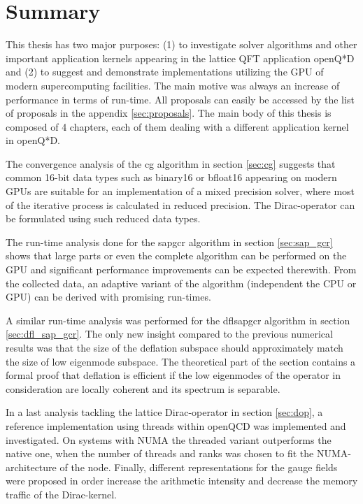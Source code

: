 \documentclass{article}
\theoremstyle{plain} %
\theoremstyle{convention} %
\theoremstyle{remark} %
\numberwithin{equation}{section}
\begin{document}
\section{Summary}

\label{sec:summary}

This thesis has two major purposes: (1) to investigate solver algorithms and other important application kernels appearing in the lattice QFT application openQ*D and (2) to suggest and demonstrate implementations utilizing the GPU of modern supercomputing facilities. The main motive was always an increase of performance in terms of run-time. All proposals can easily be accessed by the list of proposals in the appendix \ref{sec:proposals}. The main body of this thesis is composed of \num{4} chapters, each of them dealing with a different application kernel in openQ*D.

The convergence analysis of the \acrshort{cg} algorithm in section \ref{sec:cg} suggests that common \num{16}-bit data types such as \gls{binary16} or \gls{bfloat16} appearing on modern GPUs are suitable for an implementation of a mixed precision solver, where most of the iterative process is calculated in reduced precision. The Dirac-operator can be formulated using such reduced data types.

The run-time analysis done for the \acrshort{sapgcr} algorithm in section \ref{sec:sap_gcr} shows that large parts or even the complete algorithm can be performed on the GPU and significant performance improvements can be expected therewith. From the collected data, an adaptive variant of the algorithm (independent the CPU or GPU) can be derived with promising run-times.

A similar run-time analysis was performed for the \acrshort{dflsapgcr} algorithm in section \ref{sec:dfl_sap_gcr}. The only new insight compared to the previous numerical results was that the size of the deflation subspace should approximately match the size of low eigenmode subspace. The theoretical part of the section contains a formal proof that deflation is efficient if the low eigenmodes of the operator in consideration are locally coherent and its spectrum is separable.

In a last analysis tackling the lattice Dirac-operator in section \ref{sec:dop}, a reference implementation using threads within openQCD was implemented and investigated. On systems with NUMA the threaded variant outperforms the native one, when the number of threads and ranks was chosen to fit the NUMA-architecture of the node. Finally, different representations for the gauge fields were proposed in order increase the arithmetic intensity and decrease the memory traffic of the Dirac-kernel.
\end{document}
